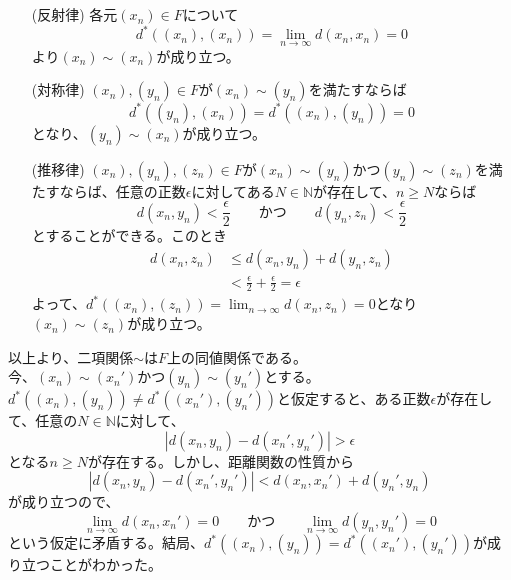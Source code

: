 \documentclass{jsarticle}
\begin{document}
\subsection{}
\begin{enumerate}
\item [(反射律)]
各元$(x_n)\in F$について
\[d^*((x_n),(x_n))=\lim_{n\to\infty}d(x_n,x_n)=0\]
より$(x_n)\sim (x_n)$が成り立つ。

\item [(対称律)]
$(x_n),(y_n)\in F$が$(x_n)\sim (y_n)$を満たすならば
\[d^*((y_n),(x_n))=d^*((x_n),(y_n))=0\]
となり、$(y_n)\sim (x_n)$が成り立つ。

\item [(推移律)]
$(x_n),(y_n),(z_n)\in F$が$(x_n)\sim (y_n)$かつ$(y_n)\sim (z_n)$を満たすならば、任意の正数$\epsilon$に対してある$N\in\mathbb{N}$が存在して、$n\geq N$ならば
\[d(x_n,y_n)<\frac{\epsilon}{2}  \qquad かつ\qquad  d(y_n,z_n)<\frac{\epsilon}{2}\]
とすることができる。このとき
\begin{align*}
d(x_n,z_n)&\leq d(x_n, y_n)+d(y_n,z_n)\\
&< \frac{\epsilon}{2}+\frac{\epsilon}{2}=\epsilon
\end{align*}
よって、$d^*((x_n),(z_n))=\lim_{n\to\infty}d(x_n,z_n)=0$となり$(x_n)\sim (z_n)$が成り立つ。
\end{enumerate}
以上より、二項関係$\sim$は$F$上の同値関係である。\\
今、$(x_n)\sim (x_n')$かつ$(y_n)\sim (y_n')$とする。$d^*((x_n),(y_n))\neq d^*((x_n'),(y_n'))$と仮定すると、ある正数$\epsilon$が存在して、任意の$N\in\mathbb{N}$に対して、
\[|d(x_n,y_n)- d(x_n',y_n')|>\epsilon\]
となる$n\geq N$が存在する。しかし、距離関数の性質から
\[|d(x_n,y_n)-d(x_n',y_n')|<d(x_n,x_n')+d(y_n',y_n)\]
が成り立つので、
\[\lim_{n\to\infty}d(x_n,x_n')=0 \qquad かつ \qquad \lim_{n\to\infty}d(y_n,y_n')=0\]
という仮定に矛盾する。結局、$d^*((x_n),(y_n))= d^*((x_n'),(y_n'))$が成り立つことがわかった。



\end{document}
